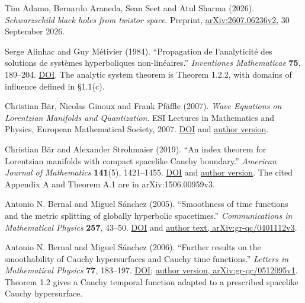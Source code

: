 \documentclass[
  english,
  11pt,
  reqno]{amsart}
\begin{document}
\begin{thebibliography}{}

\leavevmode{}\label{ref-AdamoAranedaSeetSharma2026}%
Tim Adamo, Bernardo Araneda, Sean Seet and Atul Sharma (2026).
\emph{Schwarzschild black holes from twistor space}. Preprint,
\href{https://arxiv.org/abs/2607.06236v2}{arXiv:2607.06236v2}, 30
September 2026.

\leavevmode{}\label{ref-AlinhacMetivier1984}%
Serge Alinhac and Guy Métivier (1984). ``Propagation de l'analyticité
des solutions de systèmes hyperboliques non-linéaires.''
\emph{Inventiones Mathematicae} \textbf{75}, 189--204.
\href{https://doi.org/10.1007/BF01388563}{DOI}. The analytic system
theorem is Theorem 1.2.2, with domains of influence defined in §1.1(c).

\leavevmode{}\label{ref-BarGinouxPfaeffle2007}%
Christian Bär, Nicolas Ginoux and Frank Pfäffle (2007). \emph{Wave
Equations on Lorentzian Manifolds and Quantization}. ESI Lectures in
Mathematics and Physics, European Mathematical Society, 2007.
\href{https://doi.org/10.4171/037}{DOI} and
\href{https://arxiv.org/abs/0806.1036v1}{author version}.

\leavevmode{}\label{ref-BarStrohmaier2019}%
Christian Bär and Alexander Strohmaier (2019). ``An index theorem for
Lorentzian manifolds with compact spacelike Cauchy boundary.''
\emph{American Journal of Mathematics} \textbf{141}(5), 1421--1455.
\href{https://doi.org/10.1353/ajm.2019.0037}{DOI} and
\href{https://arxiv.org/abs/1506.00959v3}{author version}. The cited
Appendix A and Theorem A.1 are in arXiv:1506.00959v3.

\leavevmode{}\label{ref-BernalSanchez2005}%
Antonio N. Bernal and Miguel Sánchez (2005). ``Smoothness of time
functions and the metric splitting of globally hyperbolic spacetimes.''
\emph{Communications in Mathematical Physics} \textbf{257}, 43--50.
\href{https://doi.org/10.1007/s00220-005-1346-1}{DOI} and
\href{https://arxiv.org/abs/gr-qc/0401112v3}{author text,
arXiv:gr-qc/0401112v3}.

\leavevmode{}\label{ref-BernalSanchez2006}%
Antonio N. Bernal and Miguel Sánchez (2006). ``Further results on the
smoothability of Cauchy hypersurfaces and Cauchy time functions.''
\emph{Letters in Mathematical Physics} \textbf{77}, 183--197.
\href{https://doi.org/10.1007/s11005-006-0091-5}{DOI};
\href{https://arxiv.org/abs/gr-qc/0512095v1}{author version,
arXiv:gr-qc/0512095v1}. Theorem 1.2 gives a Cauchy temporal function
adapted to a prescribed spacelike Cauchy hypersurface.


\end{thebibliography}
\end{document}
